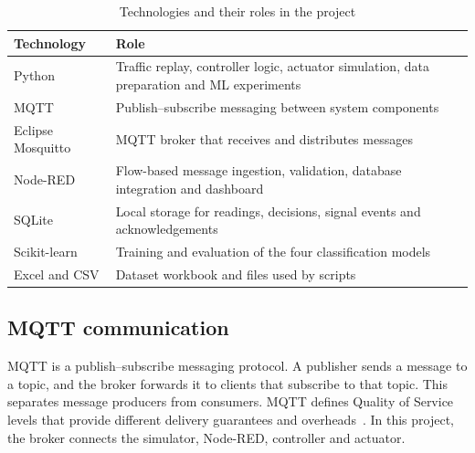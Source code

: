 \documentclass[12pt,a4paper,oneside]{report}
\begin{document}
\begin{table}[htbp]\centering\small
\caption{Technologies and their roles in the project}\label{tab:tech-roles}
\begin{tabular}{|p{}|p{}|}\hline
\textbf{Technology} & \textbf{Role} \\\hline
Python & Traffic replay, controller logic, actuator simulation, data preparation and ML experiments \\\hline
MQTT & Publish--subscribe messaging between system components \\\hline
Eclipse Mosquitto & MQTT broker that receives and distributes messages~\cite{ref2} \\\hline
Node-RED & Flow-based message ingestion, validation, database integration and dashboard~\cite{ref3} \\\hline
SQLite & Local storage for readings, decisions, signal events and acknowledgements~\cite{ref4} \\\hline
Scikit-learn & Training and evaluation of the four classification models~\cite{ref5} \\\hline
Excel and CSV & Dataset workbook and files used by scripts \\\hline
\end{tabular}\end{table}

\subsection{MQTT communication}
MQTT is a publish--subscribe messaging protocol. A publisher sends a message to a topic, and the broker forwards it to clients that subscribe to that topic. This separates message producers from consumers. MQTT defines Quality of Service levels that provide different delivery guarantees and overheads~\cite{ref1}. In this project, the broker connects the simulator, Node-RED, controller and actuator.
\end{document}
